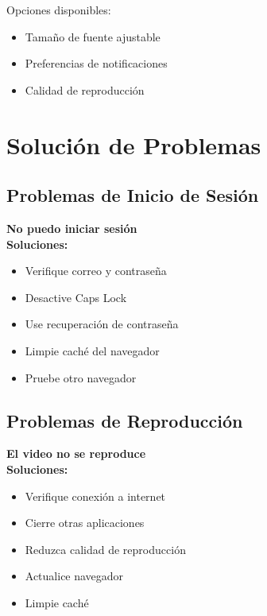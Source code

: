 \documentclass[11pt,a4paper,twoside]{book}
\begin{document}
Opciones disponibles:
\begin{itemize}
    \item Tamaño de fuente ajustable
    \item Preferencias de notificaciones
    \item Calidad de reproducción
\end{itemize}

\chapter{Solución de Problemas}

\section{Problemas de Inicio de Sesión}

\begin{errorbox}
\textbf{No puedo iniciar sesión}\\
\textbf{Soluciones:}
\begin{itemize}
    \item Verifique correo y contraseña
    \item Desactive Caps Lock
    \item Use recuperación de contraseña
    \item Limpie caché del navegador
    \item Pruebe otro navegador
\end{itemize}
\end{errorbox}

\section{Problemas de Reproducción}

\begin{errorbox}
\textbf{El video no se reproduce}\\
\textbf{Soluciones:}
\begin{itemize}
    \item Verifique conexión a internet
    \item Cierre otras aplicaciones
    \item Reduzca calidad de reproducción
    \item Actualice navegador
    \item Limpie caché
\end{itemize}
\end{errorbox}
\end{document}
